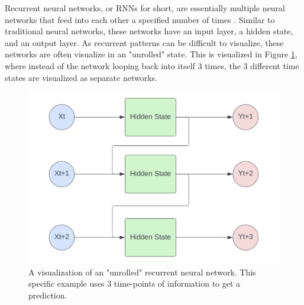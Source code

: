 Recurrent neural networks, or RNNs for short, are essentially multiple neural networks that feed into each other a specified number of times \citep{rumelhart1986learning}. Similar to traditional neural networks, these networks have an input layer, a hidden state, and an output layer. As recurrent patterns can be difficult to visualize, these networks are often visualize in an "unrolled" state. This is visualized in Figure \ref{fig:RNN}, where instead of the network looping back into itself 3 times, the 3 different time states are visualized as separate networks.

\begin{figure}[ht]
    \centering
    \includegraphics[width=0.6\linewidth]{"Figures/Recurrent_NN.png"}
    \caption{A visualization of an "unrolled" recurrent neural network. This specific example uses 3 time-points of information to get a prediction.}
    \label{fig:RNN}
\end{figure}

